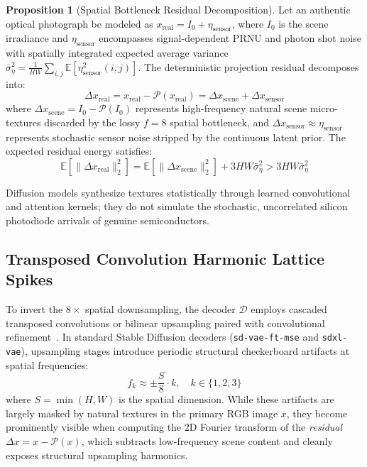 \documentclass[11pt]{article}
\theoremstyle{definition}
\newtheorem{proposition}{Proposition}
\begin{document}
\begin{proposition}[Spatial Bottleneck Residual Decomposition]
Let an authentic optical photograph be modeled as $x_{\text{real}} = I_0 + \eta_{\text{sensor}}$, where $I_0$ is the scene irradiance and $\eta_{\text{sensor}}$ encompasses signal-dependent PRNU and photon shot noise with spatially integrated expected average variance $\bar{\sigma}_\eta^2 = \frac{1}{HW}\sum_{i,j}\mathbb{E}[\eta_{\text{sensor}}^2(i, j)]$. The deterministic projection residual decomposes into:
\begin{equation}
\Delta x_{\text{real}} = x_{\text{real}} - \mathcal{P}(x_{\text{real}}) = \Delta x_{\text{scene}} + \Delta x_{\text{sensor}}
\end{equation}
where $\Delta x_{\text{scene}} = I_0 - \mathcal{P}(I_0)$ represents high-frequency natural scene micro-textures discarded by the lossy $f=8$ spatial bottleneck, and $\Delta x_{\text{sensor}} \approx \eta_{\text{sensor}}$ represents stochastic sensor noise stripped by the continuous latent prior. The expected residual energy satisfies:
\begin{equation}
\mathbb{E}\left[ \| \Delta x_{\text{real}} \|_2^2 \right] = \mathbb{E}\left[ \| \Delta x_{\text{scene}} \|_2^2 \right] + 3HW \bar{\sigma}_\eta^2 > 3HW \bar{\sigma}_\eta^2
\end{equation}
\end{proposition}

Diffusion models synthesize textures statistically through learned convolutional and attention kernels; they do not simulate the stochastic, uncorrelated silicon photodiode arrivals of genuine semiconductors.

\subsection{Transposed Convolution Harmonic Lattice Spikes}
To invert the $8\times$ spatial downsampling, the decoder $\mathcal{D}$ employs cascaded transposed convolutions or bilinear upsampling paired with convolutional refinement~\citep{durall2020watch,frank2020leveraging}. In standard Stable Diffusion decoders (\texttt{sd-vae-ft-mse} and \texttt{sdxl-vae}), upsampling stages introduce periodic structural checkerboard artifacts at spatial frequencies:
\begin{equation}
f_k \approx \pm \frac{S}{8} \cdot k, \quad k \in \{1, 2, 3\}
\end{equation}
where $S = \min(H, W)$ is the spatial dimension. While these artifacts are largely masked by natural textures in the primary RGB image $x$, they become prominently visible when computing the 2D Fourier transform of the \textit{residual} $\Delta x = x - \mathcal{P}(x)$, which subtracts low-frequency scene content and cleanly exposes structural upsampling harmonics.
\end{document}
